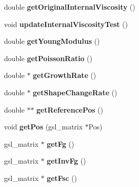 \begin{DoxyCompactItemize}
\item 
\hypertarget{classShapeBase_ac0651f685642cfddf6cefa3542ece51a}{}double {\bfseries get\+Original\+Internal\+Viscosity} ()\label{classShapeBase_ac0651f685642cfddf6cefa3542ece51a}

\item 
\hypertarget{classShapeBase_a6bdc40f5dd963a576fb2678d60da0ad1}{}void {\bfseries update\+Internal\+Viscosity\+Test} ()\label{classShapeBase_a6bdc40f5dd963a576fb2678d60da0ad1}

\item 
\hypertarget{classShapeBase_ade96ff86461eaabce716e83fa68bfa19}{}double {\bfseries get\+Young\+Modulus} ()\label{classShapeBase_ade96ff86461eaabce716e83fa68bfa19}

\item 
\hypertarget{classShapeBase_a01140f17779cd2e990c9f28e3c86b77e}{}double {\bfseries get\+Poisson\+Ratio} ()\label{classShapeBase_a01140f17779cd2e990c9f28e3c86b77e}

\item 
\hypertarget{classShapeBase_a94b472ab0c5242226313cd096e17a3fe}{}double $\ast$ {\bfseries get\+Growth\+Rate} ()\label{classShapeBase_a94b472ab0c5242226313cd096e17a3fe}

\item 
\hypertarget{classShapeBase_a6f4d5556ac05b897919f49dacd0f8101}{}double $\ast$ {\bfseries get\+Shape\+Change\+Rate} ()\label{classShapeBase_a6f4d5556ac05b897919f49dacd0f8101}

\item 
\hypertarget{classShapeBase_a91ba74cc41917dbe821159023f1bf1ec}{}double $\ast$$\ast$ {\bfseries get\+Reference\+Pos} ()\label{classShapeBase_a91ba74cc41917dbe821159023f1bf1ec}

\item 
\hypertarget{classShapeBase_ab1906a5afda8fcbeef23010759f2538c}{}void {\bfseries get\+Pos} (gsl\+\_\+matrix $\ast$Pos)\label{classShapeBase_ab1906a5afda8fcbeef23010759f2538c}

\item 
\hypertarget{classShapeBase_a79889ef9cb7831a50e5391cb1cc19793}{}gsl\+\_\+matrix $\ast$ {\bfseries get\+Fg} ()\label{classShapeBase_a79889ef9cb7831a50e5391cb1cc19793}

\item 
\hypertarget{classShapeBase_aa79110e674e80a1e429669ccb5c3e4cb}{}gsl\+\_\+matrix $\ast$ {\bfseries get\+Inv\+Fg} ()\label{classShapeBase_aa79110e674e80a1e429669ccb5c3e4cb}

\item 
\hypertarget{classShapeBase_ab261573ddd6829df0ee104260352c7ae}{}gsl\+\_\+matrix $\ast$ {\bfseries get\+Fsc} ()\label{classShapeBase_ab261573ddd6829df0ee104260352c7ae}


\end{DoxyCompactItemize}
